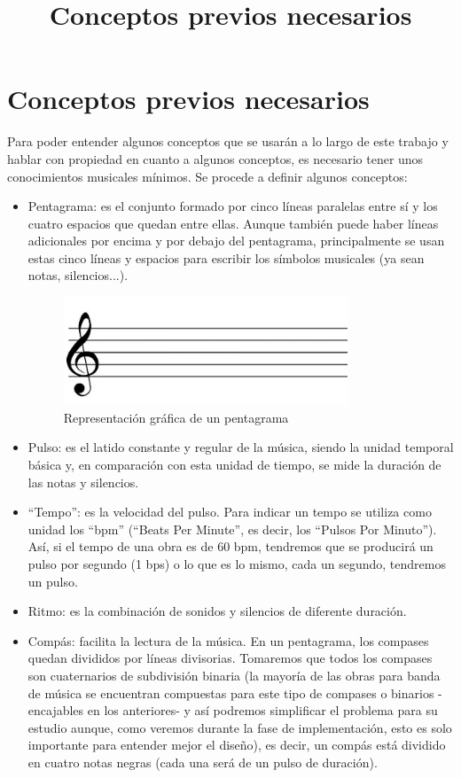 \title{Conceptos previos necesarios}
\section{Conceptos previos necesarios}
Para poder entender algunos conceptos que se usarán a lo largo de este trabajo y hablar con propiedad en cuanto a algunos conceptos, es necesario tener unos conocimientos musicales mínimos. Se procede a definir algunos conceptos:


\begin{itemize}
\item Pentagrama: es el conjunto formado por cinco líneas paralelas entre sí y los cuatro espacios que quedan entre ellas. Aunque también puede haber líneas adicionales por encima y por debajo del pentagrama, principalmente se usan estas cinco líneas y espacios para escribir los símbolos musicales (ya sean notas, silencios...).
  \begin{figure}[htb]
  \centering
  \includegraphics[width=0.8\textwidth]{./imagenes/pentagrama}
  \caption{Representación gráfica de un pentagrama} \label{fig:pentagrama}
  \end{figure}
\item Pulso: es el latido constante y regular de la música, siendo la unidad temporal básica y, en comparación con esta unidad de tiempo, se mide la duración de las notas y silencios.
\item “Tempo”: es la velocidad del pulso. Para indicar un tempo se utiliza como unidad los “bpm” (“Beats Per Minute”, es decir, los “Pulsos Por Minuto”). Así, si el tempo de una obra es de 60 bpm, tendremos que se producirá un pulso por segundo (1 bps) o lo que es lo mismo, cada un segundo, tendremos un pulso.
\item Ritmo: es la combinación de sonidos y silencios de diferente duración.
\item Compás: facilita la lectura de la música. En un pentagrama, los compases quedan divididos por líneas divisorias. Tomaremos que todos los compases son cuaternarios de subdivisión binaria (la mayoría de las obras para banda de música se encuentran compuestas para este tipo de compases o binarios -encajables en los anteriores- y así podremos simplificar el problema para su estudio aunque, como veremos durante la fase de implementación, esto es solo importante para entender mejor el diseño), es decir, un compás está dividido en cuatro notas negras (cada una será de un pulso de duración).
\end{itemize}

